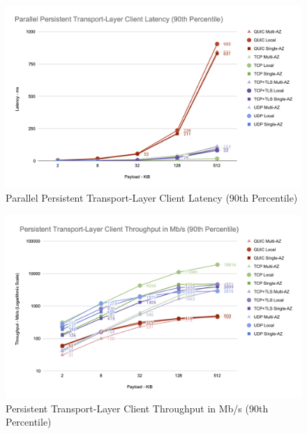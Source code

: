 \begin{figure}[h!]
    \centering
    \includegraphics[width=\linewidth]{figures/charts/Parallel Persistent Transport-Layer Client Latency (90th Percentile).png}
    \caption{Parallel Persistent Transport-Layer Client Latency (90th Percentile)}
    \label{fig:parallel_transport_latency}
\end{figure}

\begin{figure}[h!]
    \centering
    \includegraphics[width=\linewidth]{figures/charts/Persistent Transport-Layer Client Throughput in Mb_s (90th Percentile).png}
    \caption{Persistent Transport-Layer Client Throughput in Mb/s (90th Percentile)}
    \label{fig:persistent_transport_throughput}
\end{figure}


